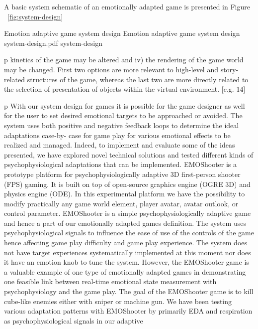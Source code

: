 A basic system schematic of an emotionally adapted game is presented in Figure ~\ref{fig:system-design}

\img
{Emotion adaptive game system design}
{Emotion adaptive game system design}
{system-design.pdf}
{system-design}


p kinetics of the game may be altered and iv) the rendering of the game world may be changed. First two options are more relevant to high-level and story-related structures of the game, whereas the last two are more directly related to the selection of presentation of objects within the virtual environment. [e.g. 14]

p With our system design for games it is possible for the game designer as well for the user to set desired emotional targets to be approached or avoided. The system uses both positive and negative feedback loops to determine the ideal adaptations case-by- case for game play for various emotional effects to be realized and managed. Indeed, to implement and evaluate some of the ideas presented, we have explored novel technical solutions and tested different kinds of psychophysiological adaptations that can be implemented. EMOShooter is a prototype platform for psychophysiologically adaptive 3D first-person shooter (FPS) gaming. It is built on top of open-source graphics engine (OGRE 3D) and physics engine (ODE). In this experimental platform we have the possibility to modify practically any game world element, player avatar, avatar outlook, or control parameter.  EMOShooter is a simple psychophysiologically adaptive game and hence a part of our emotionally adapted games definition. The system uses psychophysiological signals to influence the ease of use of the controls of the game hence affecting game play difficulty and game play experience. The system does not have target experiences systematically implemented at this moment nor does it have an emotion knob to tune the system. However, the EMOShooter game is a valuable example of one type of emotionally adapted games in demonstrating one feasible link between real-time emotional state measurement with psychophysiology and the game play. The goal of the EMOShooter game is to kill cube-like enemies either with sniper or machine gun. We have been testing various adaptation patterns with EMOShooter by primarily EDA and respiration as psychophysiological signals in our adaptive

